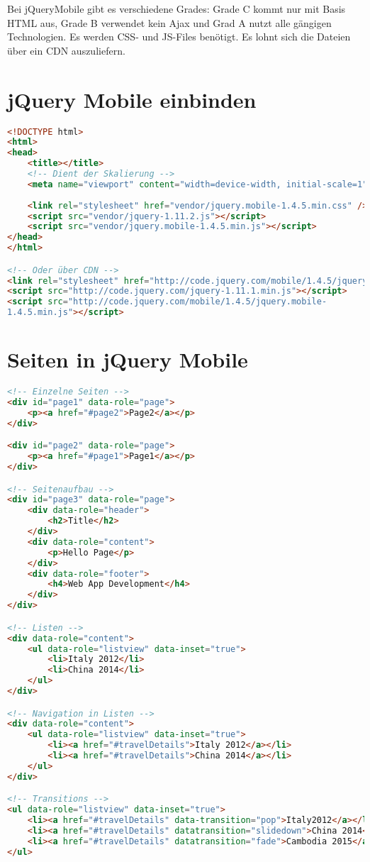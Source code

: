 Bei jQueryMobile gibt es verschiedene Grades: Grade C kommt nur mit Basis HTML aus, Grade B verwendet kein Ajax und Grad A nutzt alle gängigen Technologien. Es werden CSS- und JS-Files benötigt. Es lohnt sich die Dateien über ein CDN auszuliefern.

\section{jQuery Mobile einbinden}
\begin{lstlisting}[language=HTML,label=lst:jquery-einbinden,caption=Einbinden von jQuery Mobile]
<!DOCTYPE html>
<html>
<head>
	<title></title>
	<!-- Dient der Skalierung -->
	<meta name="viewport" content="width=device-width, initial-scale=1">
	
	<link rel="stylesheet" href="vendor/jquery.mobile-1.4.5.min.css" />
	<script src="vendor/jquery-1.11.2.js"></script>
	<script src="vendor/jquery.mobile-1.4.5.min.js"></script>
</head>
</html>

<!-- Oder über CDN -->
<link rel="stylesheet" href="http://code.jquery.com/mobile/1.4.5/jquery.mobile-1.4.5.min.css" />
<script src="http://code.jquery.com/jquery-1.11.1.min.js"></script>
<script src="http://code.jquery.com/mobile/1.4.5/jquery.mobile-
1.4.5.min.js"></script>
\end{lstlisting}

\section{Seiten in jQuery Mobile}
\begin{lstlisting}[language=HTML,label=lst:jquery-seiten,caption=Seiten in jQuery Mobile]
<!-- Einzelne Seiten -->
<div id="page1" data-role="page">
	<p><a href="#page2">Page2</a></p>
</div>

<div id="page2" data-role="page">
	<p><a href="#page1">Page1</a></p>
</div>

<!-- Seitenaufbau -->
<div id="page3" data-role="page">
	<div data-role="header">
		<h2>Title</h2>
	</div>
	<div data-role="content">
		<p>Hello Page</p>
	</div>
	<div data-role="footer">
		<h4>Web App Development</h4>
	</div>
</div>

<!-- Listen -->
<div data-role="content">
	<ul data-role="listview" data-inset="true">
		<li>Italy 2012</li>
		<li>China 2014</li>
	</ul>
</div>

<!-- Navigation in Listen -->
<div data-role="content">
	<ul data-role="listview" data-inset="true">
		<li><a href="#travelDetails">Italy 2012</a></li>
		<li><a href="#travelDetails">China 2014</a></li>
	</ul>
</div>

<!-- Transitions -->
<ul data-role="listview" data-inset="true">
	<li><a href="#travelDetails" data-transition="pop">Italy2012</a></li>
	<li><a href="#travelDetails" datatransition="slidedown">China 2014</a></li>
	<li><a href="#travelDetails" datatransition="fade">Cambodia 2015</a></li>
</ul>
\end{lstlisting}

